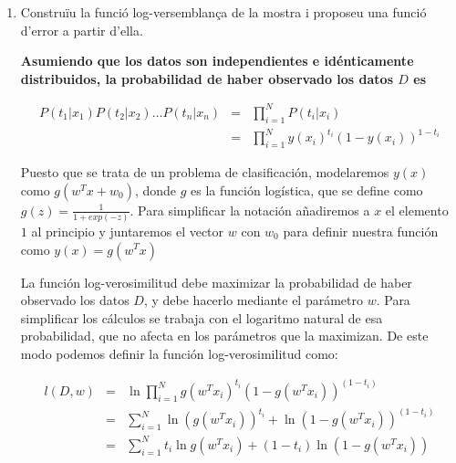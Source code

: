 \documentclass[a4paper]{article}
\begin{document}
\begin{enumerate}
 \item Construïu la funció log-versemblança de la mostra i proposeu una funció d'error a partir d'ella.

       {\bfseries
       Asumiendo que los datos son independientes e idénticamente distribuidos, la probabilidad de haber observado los datos $D$ es

       \begin{eqnarray*}
        P(t_1 | x_1 )P(t_2 | x_2 )\dots P(t_n | x_n ) &=& \prod_{i = 1}^{N} P(t_i | x_i ) \\
        &=& \prod_{i = 1}^{N} y(x_i)^{t_i} (1 - y(x_i))^{1-t_i}
       \end{eqnarray*}

       Puesto que se trata de un problema de clasificación, modelaremos $y(x)$ como $g(w^Tx + w_0)$, donde $g$ es la función logística, que se define como $g(z) = \frac{1}{1 + exp(-z)}$. Para simplificar la notación añadiremos a $x$ el elemento $1$ al principio y juntaremos el vector $w$ con $w_0$ para definir nuestra función como $y(x) = g(w^Tx)$


       La función log-verosimilitud debe maximizar la probabilidad de haber observado los datos $D$, y debe hacerlo mediante el parámetro $w$. Para simplificar los cálculos se trabaja con el logaritmo natural de esa probabilidad, que no afecta en los parámetros que la maximizan. De este modo podemos definir la función log-verosimilitud como:


       \begin{eqnarray*}
        l(D, w)
        &=& \ln
        \prod_{i = 1}^{N}
        g(w^Tx_i)^{t_i}
        (1 - g(w^Tx_i))^{(1 - t_i)} \\
        &=&
        \sum_{i = 1}^{N} \ln(g(w^Tx_i))^{t_i} + \ln (1 - g(w^Tx_i))^{(1 - t_i)} \\
        &=&
        \sum_{i = 1}^{N}
        t_i\ln g(w^Tx_i) + (1-t_i)\ln(1-g(w^Tx_i))
       \end{eqnarray*}

}
\end{enumerate}
\end{document}
